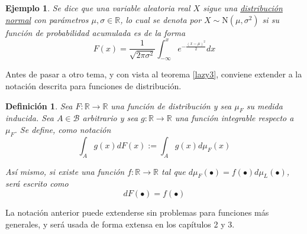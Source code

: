 \documentclass[12pt,letterpaper]{book}
\newtheorem{definicion}{Definición}[chapter]
\newtheorem{ejemplo}{Ejemplo}[chapter]
\newcommand{\R}{\mathbb{R}}
\begin{document}
\begin{ejemplo}
Se dice que una variable aleatoria real $X$ sigue una \ul{distribuci\'on normal} con parámetros $\mu, \sigma \in \R$, lo cual se denota por $X\sim \text{N}(\mu,\sigma^{2})$ si su función de probabilidad acumulada es de la forma
\begin{equation}
F(x) = \frac{1}{\sqrt{2 \pi \sigma^{2}}} \int_{-\infty}^{x} e^{-\frac{(x-\mu)^{2}}{2}} dx
\end{equation}
\end{ejemplo}

Antes de pasar a otro tema, y con vista al teorema \ref{lazy3}, conviene extender a la notación descrita para funciones de distribución.

\begin{definicion}
Sea $F: \R\rightarrow\R$ una función de distribución y sea $\mu_F$ su medida inducida.
%
Sea $A \in \mathcal{B}$ arbitrario y sea $g: \R\rightarrow\R$ una función integrable respecto a $\mu_F$.
%
Se define, como notación
\begin{equation}
\int_A g(x) dF(x) := \int_A g(x) d\mu_F(x) 
\end{equation}

Así mismo, si existe una función $f: \R \rightarrow \R$ tal que $d\mu_F(\bullet) = f(\bullet) d\mu_L(\bullet) $, será escrito como
\begin{equation}
dF(\bullet) = f(\bullet) 
\end{equation}
\end{definicion}

La notación anterior puede extenderse sin problemas para funciones más generales, y será usada de forma extensa en los capítulos 2 y 3.

\end{document}
